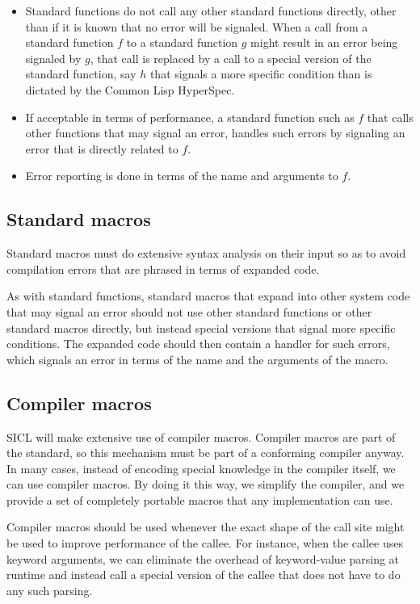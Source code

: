 \documentclass{article}
\def\sysname{SICL}
\begin{document}
\begin{itemize}
\item Standard functions do not call any other standard functions
  directly, other than if it is known that no error will be signaled.
  When a call from a standard function $f$ to a standard function $g$
  might result in an error being signaled by $g$, that call is
  replaced by a call to a special version of the standard function,
  say $h$ that signals a more specific condition than is dictated by
  the Common Lisp HyperSpec.
\item If acceptable in terms of performance, a standard function such
  as $f$ that calls other functions that may signal an error, handles
  such errors by signaling an error that is directly related to $f$. 
\item Error reporting is done in terms of the name and arguments to
  $f$. 
  
\end{itemize}

\subsection{Standard macros}

Standard macros must do extensive syntax analysis on their input so as
to avoid compilation errors that are phrased in terms of expanded
code.  

As with standard functions, standard macros that expand into other
system code that may signal an error should not use other standard
functions or other standard macros directly, but instead special
versions that signal more specific conditions.  The expanded code
should then contain a handler for such errors, which signals an error
in terms of the name and the arguments of the macro. 

\subsection{Compiler macros}

{\sysname} will make extensive use of compiler macros.  Compiler
macros are part of the standard, so this mechanism must be part of a
conforming compiler anyway.  In many cases, instead of encoding
special knowledge in the compiler itself, we can use compiler macros.
By doing it this way, we simplify the compiler, and we provide a set
of completely portable macros that any implementation can use. 

Compiler macros should be used whenever the exact shape of the call
site might be used to improve performance of the callee.  For
instance, when the callee uses keyword arguments, we can eliminate the
overhead of keyword-value parsing at runtime and instead call a
special version of the callee that does not have to do any such
parsing.  
\end{document}

